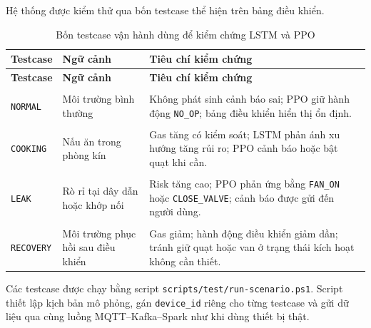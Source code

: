 Hệ thống được kiểm thử qua bốn testcase thể hiện trên bảng điều khiển.

\begingroup
\footnotesize
\renewcommand{\arraystretch}{1.35}
\setlength{\tabcolsep}{5pt}
\setlength{\LTleft}{0pt}
\setlength{\LTright}{0pt}

\begin{longtable}{
  >{\raggedright\arraybackslash}p{2.8cm}
  >{\raggedright\arraybackslash}p{3.4cm}
  >{\raggedright\arraybackslash}p{\dimexpr\textwidth-6.2cm-6\tabcolsep\relax}
}
\caption{Bốn testcase vận hành dùng để kiểm chứng LSTM và PPO}
\label{tab:runtime_scenarios} \\
\toprule
\textbf{Testcase} 
& \textbf{Ngữ cảnh} 
& \textbf{Tiêu chí kiểm chứng} \\
\midrule
\endfirsthead
\toprule
\textbf{Testcase} 
& \textbf{Ngữ cảnh} 
& \textbf{Tiêu chí kiểm chứng} \\
\midrule
\endhead
\endfoot
\bottomrule
\endlastfoot

\makecell[l]{\texttt{TC1\_}\\\texttt{NORMAL}}
& Môi trường bình thường
& Không phát sinh cảnh báo sai; PPO giữ hành động \texttt{NO\_OP}; bảng điều khiển hiển thị ổn định. \\

\makecell[l]{\texttt{TC2\_}\\\texttt{COOKING}}
& Nấu ăn trong phòng kín
& Gas tăng có kiểm soát; LSTM phản ánh xu hướng tăng rủi ro; PPO cảnh báo hoặc bật quạt khi cần. \\

\makecell[l]{\texttt{TC3\_}\\\texttt{LEAK}}
& Rò rỉ tại dây dẫn hoặc khớp nối
& Risk tăng cao; PPO phản ứng bằng \texttt{FAN\_ON} hoặc \texttt{CLOSE\_VALVE}; cảnh báo được gửi đến người dùng. \\

\makecell[l]{\texttt{TC4\_}\\\texttt{RECOVERY}}
& Môi trường phục hồi sau điều khiển
& Gas giảm; hành động điều khiển giảm dần; tránh giữ quạt hoặc van ở trạng thái kích hoạt không cần thiết. \\

\end{longtable}
\endgroup

Các testcase được chạy bằng script \texttt{scripts/test/run-scenario.ps1}. Script thiết lập kịch bản mô phỏng, gán \texttt{device\_id} riêng cho từng testcase và gửi dữ liệu qua cùng luồng MQTT--Kafka--Spark như khi dùng thiết bị thật.

